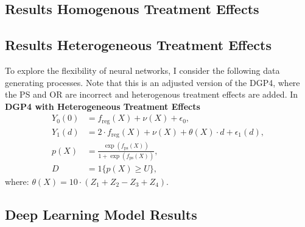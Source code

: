 \subsection{Results Homogenous Treatment Effects}



\subsection{Results Heterogeneous Treatment Effects}
To explore the flexibility of neural networks, I consider the following data generating processes. Note that this is an adjusted version of the DGP4, where the PS and OR are incorrect and heterogenous treatment effects are added. In \\
\textbf{DGP4 with Heterogeneous Treatment Effects}
\begin{align*}
    Y_0(0) &= f_{\text{reg}}(X) + \nu(X) + \epsilon_0, \\
    Y_1(d) &= 2 \cdot f_{\text{reg}}(X) + \nu(X) + \theta(X) \cdot d + \epsilon_1(d), \\
    p(X) &= \frac{\exp \left( f_{\text{ps}}(X) \right)}{1 + \exp \left( f_{\text{ps}}(X) \right)}, \\
    D &= 1\{ p(X) \geq U \},
\end{align*}
where: $\theta(X) = 10 \cdot (Z_1 + Z_2 - Z_3 + Z_4)$.



\subsection{Deep Learning Model Results}

